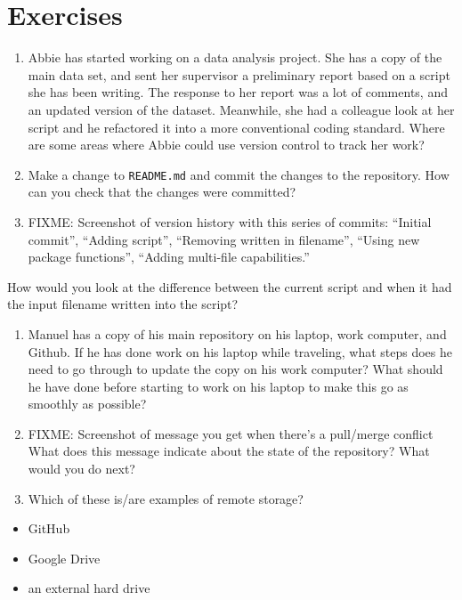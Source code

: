 \documentclass[]{Nemilov}
\providecommand{\tightlist}{%
  \setlength{\itemsep}{0pt}\setlength{\parskip}{0pt}}
\begin{document}
\hypertarget{exercises-1}{%
\section{Exercises}\label{exercises-1}}

\begin{enumerate}
\def\labelenumi{\arabic{enumi}.}
\item
  Abbie has started working on a data analysis project. She has a copy of the main data set, and sent her supervisor a preliminary report based on a script she has been writing. The response to her report was a lot of comments, and an updated version of the dataset. Meanwhile, she had a colleague look at her script and he refactored it into a more conventional coding standard.
  Where are some areas where Abbie could use version control to track her work?
\item
  Make a change to \texttt{README.md} and commit the changes to the repository. How can you check that the changes were committed?
\item
  FIXME: Screenshot of version history with this series of commits:
  ``Initial commit'', ``Adding script'', ``Removing written in filename'', ``Using new package functions'', ``Adding multi-file capabilities.''
\end{enumerate}

How would you look at the difference between the current script and when it
had the input filename written into the script?

\begin{enumerate}
\def\labelenumi{\arabic{enumi}.}
\item
  Manuel has a copy of his main repository on his laptop, work computer, and Github. If he has done work on his laptop while traveling, what steps does he need to go through to update the copy on his work computer? What should he have done before starting to work on his laptop to make this go as smoothly as possible?
\item
  FIXME: Screenshot of message you get when there's a pull/merge conflict
  What does this message indicate about the state of the repository? What would you do next?
\item
  Which of these is/are examples of remote storage?
\end{enumerate}

\begin{itemize}
\tightlist
\item
  GitHub
\item
  Google Drive
\item
  an external hard drive
\end{itemize}
\end{document}
